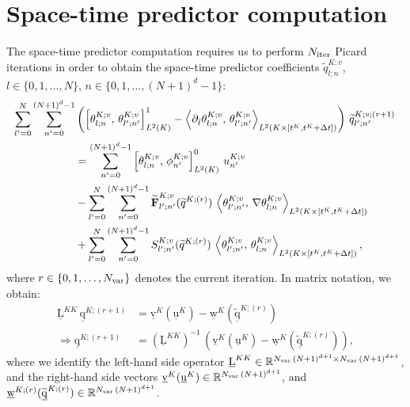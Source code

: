 \documentclass{scrreprt}
\theoremstyle{definition}
\theoremstyle{nonumberplain}
\renewcommand{\vec}[1]{{\textbf{#1}}}
\newcommand{\stvec}[1]{\widetilde{\vec{#1}}}
\newcommand{\laVec}[1]{\underline{\mathrm{#1}}}
\newcommand{\laMat}[1]{\underline{\mathrm{#1}}}
\newcommand{\cell}{K}
\begin{document}
\section{Space-time predictor computation}
The space-time predictor computation requires us to
perform $N_\textup{iter}$ Picard iterations in order
to obtain the space-time predictor
coefficients
$\widetilde{q}^{K;v}_{l;n}$,
$l\in\{0,1,\ldots,N\}$,
$n\in\{0,1,\ldots,(N+1)^{d}-1\}$:
\begin{align}
\sum_{l'=0}^{N}
\sum_{n'=0}^{(N+1)^{d}-1}
&\left(\left[\theta^{\cell;v}_{l;n},\,\theta^{\cell;v}_{l';n'}\right]^{1}_{L^2(\cell)}
-
\left\langle
\partial_{\hat{t}}\theta^{\cell;v}_{l;n},\,
\theta^{\cell;v}_{l';n'}
\right\rangle
_{L^2(\cell\times[t^\cell,t^\cell+\Delta t])}\right)
\,\widetilde{q}^{K;v;(r+1)}_{l';n'}\,
\notag
\\
&=\sum_{n'=0}^{(N+1)^{d}-1}
\left[\theta^{\cell;v}_{l;n},\,\phi^{\cell;v}_{n'}\right]^{0}_{L^2(\cell)}
\,
u^{\cell;v}_{n'}
\notag
\\
&-
\sum_{l'=0}^{N}
\sum_{n'=0}^{(N+1)^d-1}
\stvec{F}^{\cell;v}_{l';n'}
(\widetilde{q}^{\cell;(r)})
\,
\left\langle
\theta^{\cell;v}_{l';n'},\,
\nabla
\theta^{\cell;v}_{l;n}
\right\rangle
_{L^2(\cell\times[t^\cell,t^\cell+\Delta t])}
\\
&+ 
\sum_{l'=0}^{N}
\sum_{n'=0}^{(N+1)^d-1}
S^{\cell;v}_{l';n'}
(\widetilde{q}^{\cell;(r)})
\,
\left\langle
\theta^{\cell;v}_{l';n'},\,
\theta^{\cell;v}_{l;n}
\right\rangle
_{L^2(\cell\times[t^\cell,t^\cell+\Delta t])}
,
\end{align}
where $r\in\{0,1,\ldots,N_\textup{var}\}$ denotes the
current iteration.
In matrix notation, we obtain:
\begin{align}
\laVec{L}^{\cell\cell}\,\laVec{q}^{\cell;(r+1)}
&=
\laVec{v}^{K}(\laVec{u}^{\cell})-\laVec{w}^{K}(\widetilde{\laVec{q}}^{\cell;(r)})
\\
\Rightarrow
\laVec{q}^{\cell;(r+1)}
&=
{(\laVec{L}^{\cell\cell})}^{-1}\,
\left(
\laVec{v}^{K}(\laVec{u}^{\cell})-\laVec{w}^{K}(\widetilde{\laVec{q}}^{\cell;(r)})
\right)
,
\end{align}
where we identify the left-hand side operator
$\laMat{L}^{\cell\cell}\in\mathbb{R}^{N_\textup{var}\,(N+1)^{d+1}\times
N_\textup{var}\,(N+1)^{d+1}}$, and the right-hand side vectors
$\laVec{v}^{\cell}(\laVec{u}^{\cell})\in\mathbb{R}^{N_\textup{var}\,(N+1)^{d+1}}$,
and
$\laVec{w}^{\cell;(r)}(\widetilde{\laVec{q}}^{\cell;(r)})\in\mathbb{R}^{N_\textup{var}\,(N+1)^{d+1}}$.
\end{document}
